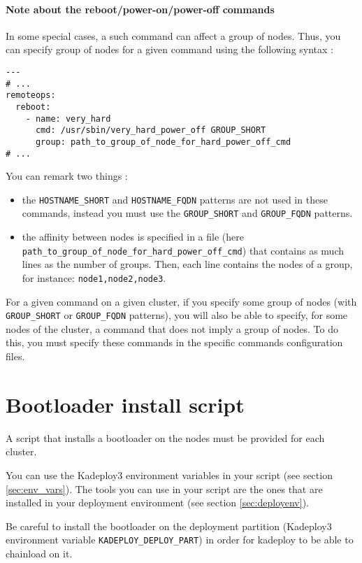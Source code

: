 \documentclass[a4wide,10pt,oneside]{book}
\begin{document}
\paragraph{Note about the reboot/power-on/power-off commands}\label{sec:groupcmd}
In some special cases, a such command can affect a group of nodes. Thus, you can specify group of nodes for a given command using the following syntax :
\begin{small}
\begin{verbatim}
---
# ...
remoteops:
  reboot:
    - name: very_hard
      cmd: /usr/sbin/very_hard_power_off GROUP_SHORT
      group: path_to_group_of_node_for_hard_power_off_cmd
# ...
\end{verbatim}
\end{small}
You can remark two things :
\begin{itemize}
\item the \texttt{HOSTNAME\_SHORT} and \texttt{HOSTNAME\_FQDN} patterns are not used in these commands, instead you must use the \texttt{GROUP\_SHORT} and \texttt{GROUP\_FQDN} patterns.
\item the affinity between nodes is specified in a file (here \texttt{path\_to\_group\_of\_node\_for\_hard\_power\_off\_cmd}) that contains as much lines as the number of groups. Then, each line contains the nodes of a group, for instance: \texttt{node1,node2,node3}.
\end{itemize}
For a given command on a given cluster, if you specify some group of nodes (with \texttt{GROUP\_SHORT} or \texttt{GROUP\_FQDN} patterns), you will also be able to specify, for some nodes of the cluster, a command that does not imply a group of nodes. To do this, you must specify these commands in the specific commands configuration files.

\section{Bootloader install script}\label{sec:bootscript}
A script that installs a bootloader on the nodes must be provided for each cluster.

You can use the Kadeploy3 environment variables in your script (see section \ref{sec:env_vars}). The tools you can use in your script are the ones that are installed in your deployment environment (see section \ref{sec:deployenv}).

Be careful to install the bootloader on the deployment partition (Kadeploy3 environment variable \texttt{KADEPLOY\_DEPLOY\_PART}) in order for kadeploy to be able to chainload on it.
\end{document}
